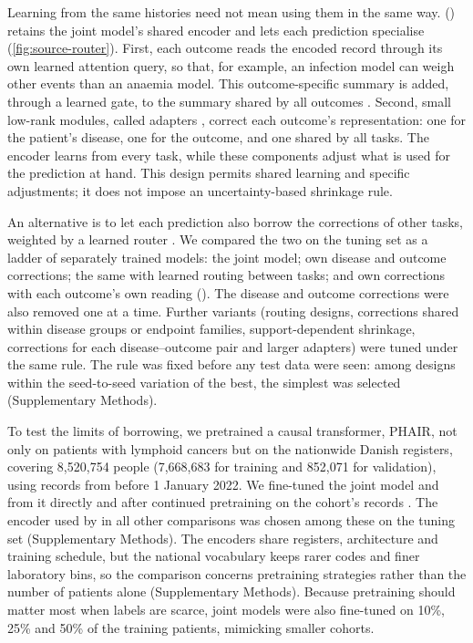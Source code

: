 Learning from the same histories need not mean using them in the same way.
 (\opera{}) retains the joint model's shared
encoder and lets each prediction specialise (\cref{fig:source-router}). %
First, each outcome reads the encoded record through its own learned attention
query, so that, for example, an infection model can weigh other events than an
anaemia model. This outcome-specific summary is added, through a learned gate,
to the summary shared by all outcomes \citep{mullenbach2018caml}. Second, small
low-rank modules, called adapters \citep{houlsby2019adapters}, correct each
outcome's representation: one for the patient's disease, one for the outcome,
and one shared by all tasks. The encoder learns from every task, while these
components adjust what is used for the prediction at hand. This design permits
shared learning and specific adjustments; it does not impose an
uncertainty-based shrinkage rule.

An alternative is to let each prediction also borrow the corrections of other
tasks, weighted by a learned router \citep{ma2018mmoe}. We compared the two on
the tuning set as a ladder of separately trained models: the joint model; own
disease and outcome corrections; the same with learned routing between tasks;
and own corrections with each outcome's own reading (\opera{}). The disease and
outcome corrections were also removed one at a time. Further variants (routing
designs, corrections shared within disease groups or endpoint families,
support-dependent shrinkage, corrections for each disease--outcome pair and
larger adapters) were tuned under the same rule. The rule was fixed before any
test data were seen: among designs within the seed-to-seed variation of the
best, the simplest was selected (Supplementary Methods).

To test the limits of borrowing, we pretrained a causal transformer, PHAIR, not
only on patients with lymphoid cancers but on the nationwide Danish registers,
covering 8,520,754 people (7,668,683 for training and 852,071 for validation), using records from before
1 January 2022. We fine-tuned the joint model and
\opera{} from it directly and after continued pretraining on the cohort's records
\citep{gururangan2020dont}. The encoder used by \opera{} in all other
comparisons was chosen among these on the tuning set (Supplementary Methods).
The encoders share registers, architecture and training schedule, but the
national vocabulary keeps rarer codes and finer laboratory bins, so the
comparison concerns pretraining strategies rather than the number of patients
alone (Supplementary Methods). Because pretraining should matter most when labels
are scarce, joint models were also fine-tuned on 10\%, 25\% and 50\% of the
training patients, mimicking smaller cohorts.

